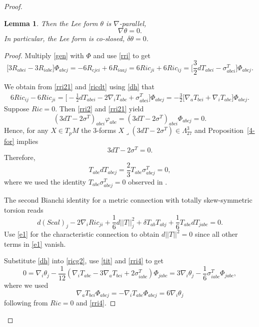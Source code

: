 \documentclass[10pt,british]{article}
\newtheorem{lemma}[thrm]{Lemma}
\def\sb {{\nabla}}
\def\p{{\varphi}}
\def\ph{{\Phi}}
\begin{document}
\begin{proof}
\begin{lemma}
Then the Lee form $\theta$ is $\sb$-parallel, $$\sb\theta=0.$$
In particular, the Lee form is co-slosed, $\delta\theta=0$.
\end{lemma}
\begin{proof}
Multiply \eqref{gen} with $\ph$ and use \eqref{rri} to get
\begin{equation}\label{rri21}
\Big[3R_{abci}-3R_{iabc}\Big]\ph_{abcj}=-6R_{cjci}+6R_{iaaj}=6Ric_{ji}+6Ric_{ij}=\Big[\frac32dT_{abci}-\sigma^T_{abci}\Big]\ph_{abcj}.
\end{equation}

We obtain from \eqref{rri21} and \eqref{ricdt} using \eqref{dh} that
\begin{equation}\label{rri4}
\begin{split}
6Ric_{ij}-6Ric_{ji}=%
\Big[-\frac12dT_{abci}-2\sb_iT_{abc}+\sigma^T_{abci} \Big]\ph_{abcj}=
-\frac32\Big[\sb_aT_{bci}+\sb_iT_{abc} \Big]\ph_{abcj}.%
\end{split}
\end{equation}
Suppose $Ric=0$. Then \eqref{rri2} and \eqref{rri21} yield 
\[(3dT-2\sigma^T)_{abci}\p_{abc}=(3dT-2\sigma^T)_{abci}\ph_{abcj}=0. \]
Hence,  for any $X\in T_pM$ the 3-forms  $X\lrcorner (3dT-2\sigma^T)\in \Lambda^3_{27}$ 
and Proposition~\ref{4-for} implies 
\begin{equation}\label{dtsig}3dT-2\sigma^T=0.\end{equation}
Therefore, $$T_{abc}dT_{abcj}=\frac23T_{abc}\sigma^T_{abcj}=0,$$
where we used the identity $T_{abc}\sigma^T_{abcj}=0$ observed in \cite[Proposition~3.1]{IS}.

The second Bianchi identity for a metric connection with totally skew-symmetric torsion reads \cite[Proposition~3.5]{IS}
\begin{equation}\label{e1}
d(Scal)_j-2\sb_iRic_{ji}+\frac16d||T||^2_j+\delta T_{ab}T_{abj}+\frac16T_{abc}dT_{jabc}=0.
\end{equation}
Use  \eqref{e1} for the characteristic connection to obtain $d||T||^2=0$ since all other terms in \eqref{e1} vanish.


Substitute \eqref{dh} into \eqref{ricg2},  use \eqref{tit} and \eqref{rri4}  to get
\begin{equation}\label{su1}
0=\sb_i\theta_j-\frac1{12}(\sb_iT_{abc}-3\sb_aT_{bci}+2\sigma^T_{iabc})\ph_{jabc}=3\sb_i\theta_j-\frac1{6}\sigma^T_{iabc}\ph_{jabc},
\end{equation}
where we used $$\sb_aT_{bci}\ph_{abcj}=-\sb_iT_{abc} \ph_{abcj}=6\sb_i\theta_j$$ following from  $Ric=0$ and \eqref{rri4}.


\end{proof}
\end{proof}
\end{document}
